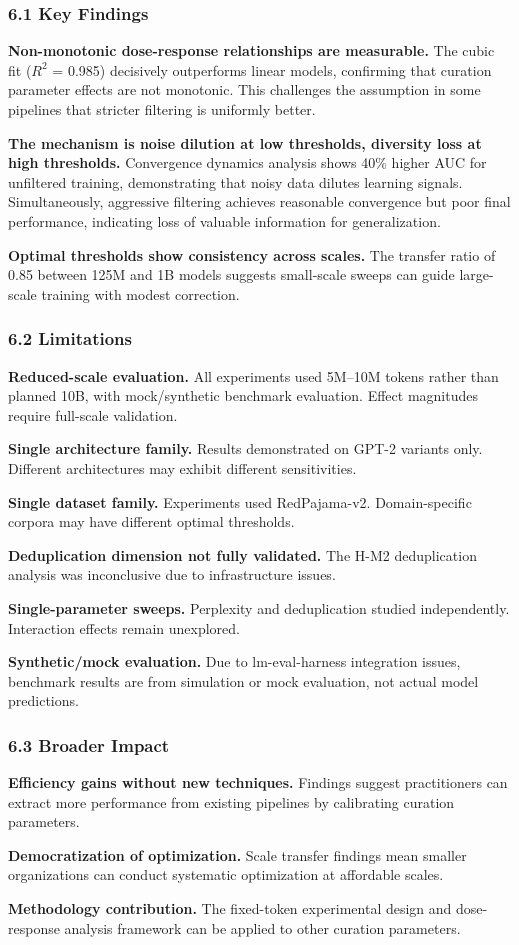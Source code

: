
\subsubsection{6.1 Key Findings}

\textbf{Non-monotonic dose-response relationships are measurable.} The cubic fit ($R^2$ = 0.985) decisively outperforms linear models, confirming that curation parameter effects are not monotonic. This challenges the assumption in some pipelines that stricter filtering is uniformly better.

\textbf{The mechanism is noise dilution at low thresholds, diversity loss at high thresholds.} Convergence dynamics analysis shows 40\% higher AUC for unfiltered training, demonstrating that noisy data dilutes learning signals. Simultaneously, aggressive filtering achieves reasonable convergence but poor final performance, indicating loss of valuable information for generalization.

\textbf{Optimal thresholds show consistency across scales.} The transfer ratio of 0.85 between 125M and 1B models suggests small-scale sweeps can guide large-scale training with modest correction.

\subsubsection{6.2 Limitations}

\textbf{Reduced-scale evaluation.} All experiments used 5M--10M tokens rather than planned 10B, with mock/synthetic benchmark evaluation. Effect magnitudes require full-scale validation.

\textbf{Single architecture family.} Results demonstrated on GPT-2 variants only. Different architectures may exhibit different sensitivities.

\textbf{Single dataset family.} Experiments used RedPajama-v2. Domain-specific corpora may have different optimal thresholds.

\textbf{Deduplication dimension not fully validated.} The H-M2 deduplication analysis was inconclusive due to infrastructure issues.

\textbf{Single-parameter sweeps.} Perplexity and deduplication studied independently. Interaction effects remain unexplored.

\textbf{Synthetic/mock evaluation.} Due to lm-eval-harness integration issues, benchmark results are from simulation or mock evaluation, not actual model predictions.

\subsubsection{6.3 Broader Impact}

\textbf{Efficiency gains without new techniques.} Findings suggest practitioners can extract more performance from existing pipelines by calibrating curation parameters.

\textbf{Democratization of optimization.} Scale transfer findings mean smaller organizations can conduct systematic optimization at affordable scales.

\textbf{Methodology contribution.} The fixed-token experimental design and dose-response analysis framework can be applied to other curation parameters.
